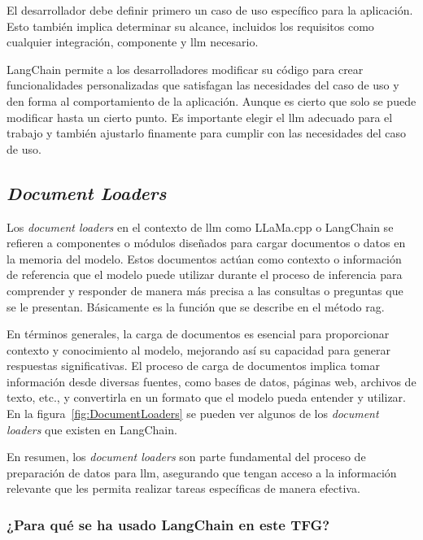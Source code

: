 El desarrollador debe definir primero un caso de uso específico para la aplicación. Esto también implica determinar su alcance, incluidos los requisitos como cualquier integración, componente y \acrshort{llm} necesario.

LangChain permite a los desarrolladores modificar su código para crear funcionalidades personalizadas que satisfagan las necesidades del caso de uso y den forma al comportamiento de la aplicación. Aunque es cierto que solo se puede modificar hasta un cierto punto. Es importante elegir el \acrshort{llm} adecuado para el trabajo y también ajustarlo finamente para cumplir con las necesidades del caso de uso.

\subsection{\textit{Document Loaders}}

Los \textit{document loaders} en el contexto de \acrlong{llm} como LLaMa.cpp o LangChain se refieren a componentes o módulos diseñados para cargar documentos o datos en la memoria del modelo. Estos documentos actúan como contexto o información de referencia que el modelo puede utilizar durante el proceso de inferencia para comprender y responder de manera más precisa a las consultas o preguntas que se le presentan. Básicamente es la función que se describe en el método \acrshort{rag}.

En términos generales, la carga de documentos es esencial para proporcionar contexto y conocimiento al modelo, mejorando así su capacidad para generar respuestas significativas. El proceso de carga de documentos implica tomar información desde diversas fuentes, como bases de datos, páginas web, archivos de texto, etc., y convertirla en un formato que el modelo pueda entender y utilizar. En la figura~\ref{fig:DocumentLoaders} se pueden ver algunos de los \textit{document loaders} que existen en LangChain.


En resumen, los \textit{document loaders} son parte fundamental del proceso de preparación de datos para \acrlong{llm}, asegurando que tengan acceso a la información relevante que les permita realizar tareas específicas de manera efectiva.

\subsubsection{¿Para qué se ha usado LangChain en este TFG?}

